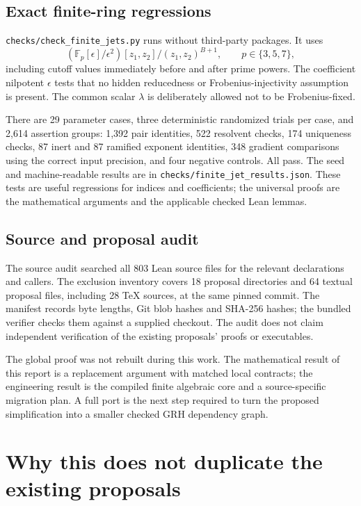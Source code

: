 \documentclass[11pt,letterpaper]{article}
\theoremstyle{remark}
\newcommand{\code}[1]{{\small\nolinkurl{#1}}}
\begin{document}
\subsection{Exact finite-ring regressions}

\code{checks/check_finite_jets.py} runs without third-party packages. It uses
\[
 (\mathbb F_p[\epsilon]/\epsilon^2)[z_1,z_2]/(z_1,z_2)^{B+1},
 \qquad p\in\{3,5,7\},
\]
including cutoff values immediately before and after prime powers. The
coefficient nilpotent \(\epsilon\) tests that no hidden reducedness or
Frobenius-injectivity assumption is present. The common scalar \(\lambda\)
is deliberately allowed not to be Frobenius-fixed.

There are 29 parameter cases, three deterministic randomized trials per case,
and 2,614 assertion groups: 1,392 pair identities, 522 resolvent checks,
174 uniqueness checks, 87 inert and 87 ramified exponent identities,
348 gradient comparisons using the correct input precision, and four negative
controls. All pass. The seed and machine-readable results are in
\code{checks/finite_jet_results.json}. These tests are useful regressions for
indices and coefficients; the universal proofs are the mathematical arguments
and the applicable checked Lean lemmas.

\subsection{Source and proposal audit}

The source audit searched all 803 Lean source files for the relevant declarations
and callers. The exclusion inventory covers 18 proposal directories and 64
textual proposal files, including 28 TeX sources, at the same pinned commit.
The manifest records byte lengths, Git blob hashes and SHA-256 hashes; the
bundled verifier checks them against a supplied checkout. The audit does not
claim independent verification of the existing proposals' proofs or executables.

The global proof was not rebuilt during this work. The mathematical result of
this report is a replacement argument with matched local contracts; the
engineering result is the compiled finite algebraic core and a source-specific
migration plan. A full port is the next step required to turn the proposed
simplification into a smaller checked GRH dependency graph.

\appendix
\section{Why this does not duplicate the existing proposals}
\label{app:inventory}
\end{document}
